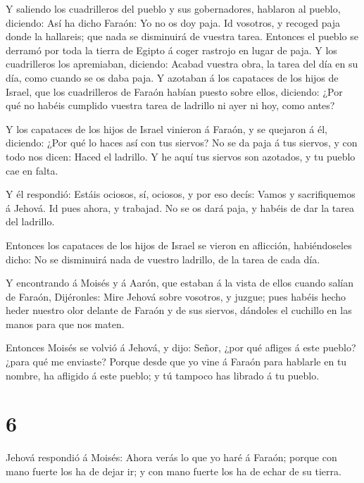  Y saliendo los cuadrilleros del pueblo y sus gobernadores,
hablaron al pueblo, diciendo: Así ha dicho Faraón: Yo no os doy paja.
 Id vosotros, y recoged paja donde la hallareis; que nada
se disminuirá de vuestra tarea.  Entonces el pueblo se
derramó por toda la tierra de Egipto á coger rastrojo en lugar de paja.
 Y los cuadrilleros los apremiaban, diciendo: Acabad
vuestra obra, la tarea del día en su día, como cuando se os daba paja.
 Y azotaban á los capataces de los hijos de Israel, que los
cuadrilleros de Faraón habían puesto sobre ellos, diciendo: ¿Por qué no
habéis cumplido vuestra tarea de ladrillo ni ayer ni hoy, como antes?

 Y los capataces de los hijos de Israel vinieron á Faraón,
y se quejaron á él, diciendo: ¿Por qué lo haces así con tus siervos?
 No se da paja á tus siervos, y con todo nos dicen: Haced
el ladrillo. Y he aquí tus siervos son azotados, y tu pueblo cae en
falta.

 Y él respondió: Estáis ociosos, sí, ociosos, y por eso
decís: Vamos y sacrifiquemos á Jehová.  Id pues ahora, y
trabajad. No se os dará paja, y habéis de dar la tarea del ladrillo.

 Entonces los capataces de los hijos de Israel se vieron en
aflicción, habiéndoseles dicho: No se disminuirá nada de vuestro
ladrillo, de la tarea de cada día.

 Y encontrando á Moisés y á Aarón, que estaban á la vista
de ellos cuando salían de Faraón,  Dijéronles: Mire Jehová
sobre vosotros, y juzgue; pues habéis hecho heder nuestro olor delante
de Faraón y de sus siervos, dándoles el cuchillo en las manos para que
nos maten.

 Entonces Moisés se volvió á Jehová, y dijo: Señor, ¿por
qué afliges á este pueblo? ¿para qué me enviaste?  Porque
desde que yo vine á Faraón para hablarle en tu nombre, ha afligido á
este pueblo; y tú tampoco has librado á tu pueblo.

\hypertarget{section-5}{%
\section{6}\label{section-5}}

 Jehová respondió á Moisés: Ahora verás lo que yo haré á
Faraón; porque con mano fuerte los ha de dejar ir; y con mano fuerte los
ha de echar de su tierra.


